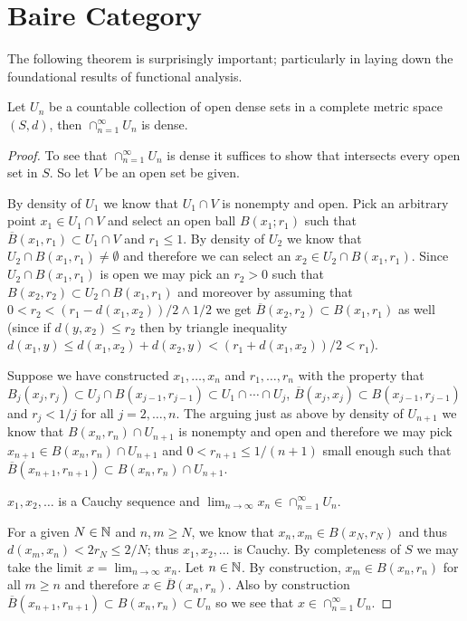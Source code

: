 \section{Baire Category}
The following theorem is surprisingly important; particularly in
laying down the foundational results of functional analysis.
\begin{thm}\label{BaireCategoryTheorem}Let $U_n$ be a countable collection of open dense sets in a
  complete metric space $(S,d)$, then $\cap_{n=1}^\infty U_n$ is dense.
\end{thm}
\begin{proof}
To see that $\cap_{n=1}^\infty U_n$ is dense it suffices to show that
intersects every open set in $S$.  So let $V$ be an open set be given.

By density of $U_1$ we
know that $U_1 \cap V$ is nonempty and open.  Pick an arbitrary point
$x_1 \in U_1 \cap V$ and select an open ball $B(x_1;
r_1)$ such that $\overline{B}(x_1, r_1) \subset U_1 \cap V$ and $r_1 \leq 1$.  By density of $U_2$ we
know that $U_2 \cap B(x_1, r_1) \neq \emptyset$ and therefore we can
select an $x_2 \in U_2 \cap B(x_1, r_1)$.  Since $U_2 \cap B(x_1,
r_1)$ is open we may pick an $r_2 > 0$ such that $B(x_2, r_2) \subset
U_2 \cap B(x_1, r_1)$ and moreover by assuming that $0 < r_2 <(
r_1-d(x_1,x_2))/2 \wedge 1/2$ we get $\overline{B}(x_2, r_2) \subset
B(x_1, r_1)$ as well (since if $d(y,x_2) \leq r_2$ then by triangle
inequality $d(x_1,y) \leq d(x_1,x_2) + d(x_2,y) < (r_1 + d(x_1,x_2))/2
< r_1$). 

Suppose we have constructed $x_1, \dotsc, x_n$ and $r_1, \dotsc, r_n$
with the property that $B_j(x_j, r_j) \subset U_j \cap B(x_{j-1},
r_{j-1}) \subset U_1 \cap \dotsb \cap U_j$, $\overline{B}(x_j, x_j)
\subset B(x_{j-1}, r_{j-1})$ and $r_j < 1/j$ for all $j=2, \dotsc, n$.  The arguing
just as above by density of $U_{n+1}$ we know that $B(x_n, r_n) \cap
U_{n+1}$ is nonempty and open and therefore we may pick $x_{n+1} \in
B(x_n, r_n) \cap U_{n+1}$ and $0 < r_{n+1} \leq 1/(n+1)$ small enough such that
$\overline{B}(x_{n+1}, r_{n+1}) \subset B(x_n,r_n) \cap U_{n+1}$.

\begin{clm}$x_1, x_2, \dotsc$ is a Cauchy sequence and $\lim_{n\to
    \infty} x_n \in \cap_{n=1}^\infty U_n$.
\end{clm}
For a given $N \in \mathbb{N}$ and $n,m \geq N$, we know that $x_n,x_m
\in B(x_N, r_N)$ and thus $d(x_m, x_n) < 2 r_N \leq 2/N$; thus $x_1,
x_2, \dotsc$ is Cauchy.  By completeness of $S$ we may take the limit $x =
\lim_{n \to \infty} x_n$.  Let $n \in \mathbb{N}$.  By construction,
$x_m \in B(x_n, r_n)$ for all $m \geq n$ and therefore $x \in
\overline{B}(x_n, r_n)$.  Also by construction $\overline{B}(x_{n+1}, r_{n+1})
\subset B(x_n, r_n) \subset U_{n}$ so we see that $x \in
\cap_{n=1}^\infty U_n$.
\end{proof}

